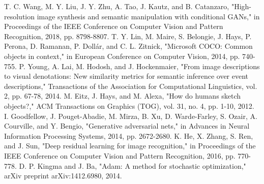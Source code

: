 \documentclass[conference]{IEEEtran}
\begin{document}
\begin{thebibliography}{00}
 T. C. Wang, M. Y. Liu, J. Y. Zhu, A. Tao, J. Kautz, and B. Catanzaro, "High-resolution image synthesis and semantic manipulation with conditional GANs," in Proceedings of the IEEE Conference on Computer Vision and Pattern Recognition, 2018, pp. 8798-8807.
 T. Y. Lin, M. Maire, S. Belongie, J. Hays, P. Perona, D. Ramanan, P. Dollár, and C. L. Zitnick, "Microsoft COCO: Common objects in context," in European Conference on Computer Vision, 2014, pp. 740-755.
 P. Young, A. Lai, M. Hodosh, and J. Hockenmaier, "From image descriptions to visual denotations: New similarity metrics for semantic inference over event descriptions," Transactions of the Association for Computational Linguistics, vol. 2, pp. 67-78, 2014.
 M. Eitz, J. Hays, and M. Alexa, "How do humans sketch objects?," ACM Transactions on Graphics (TOG), vol. 31, no. 4, pp. 1-10, 2012.
 I. Goodfellow, J. Pouget-Abadie, M. Mirza, B. Xu, D. Warde-Farley, S. Ozair, A. Courville, and Y. Bengio, "Generative adversarial nets," in Advances in Neural Information Processing Systems, 2014, pp. 2672-2680.
 K. He, X. Zhang, S. Ren, and J. Sun, "Deep residual learning for image recognition," in Proceedings of the IEEE Conference on Computer Vision and Pattern Recognition, 2016, pp. 770-778.
 D. P. Kingma and J. Ba, "Adam: A method for stochastic optimization," arXiv preprint arXiv:1412.6980, 2014.
\end{thebibliography}
\end{document}
